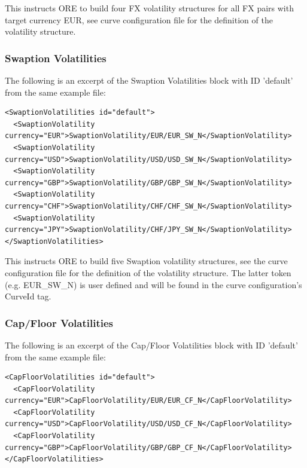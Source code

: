 This instructs ORE to build four FX volatility structures for all FX pairs with target currency EUR, see curve
configuration file for the definition of the volatility structure.

\subsubsection{Swaption Volatilities}

The following is an excerpt of the Swaption Volatilities block with ID 'default' from the same example file:

\begin{listing}[H]
\begin{verbatim}
<SwaptionVolatilities id="default">
  <SwaptionVolatility currency="EUR">SwaptionVolatility/EUR/EUR_SW_N</SwaptionVolatility>
  <SwaptionVolatility currency="USD">SwaptionVolatility/USD/USD_SW_N</SwaptionVolatility>
  <SwaptionVolatility currency="GBP">SwaptionVolatility/GBP/GBP_SW_N</SwaptionVolatility>
  <SwaptionVolatility currency="CHF">SwaptionVolatility/CHF/CHF_SW_N</SwaptionVolatility>
  <SwaptionVolatility currency="JPY">SwaptionVolatility/CHF/JPY_SW_N</SwaptionVolatility>
</SwaptionVolatilities>
\end{verbatim}
\caption{Swaption volatility block with ID 'default'}
\label{lst:swaptionvol_spec}
\end{listing}

This instructs ORE to build five Swaption volatility structures, see the curve configuration file for the definition of
the volatility structure. The latter token (e.g. EUR\_SW\_N) is user defined and will be found in the curve
configuration's CurveId tag.

\subsubsection{Cap/Floor Volatilities}

The following is an excerpt of the Cap/Floor Volatilities block with ID 'default' from the same example file:

\begin{listing}[H]
\begin{verbatim}
<CapFloorVolatilities id="default">
  <CapFloorVolatility currency="EUR">CapFloorVolatility/EUR/EUR_CF_N</CapFloorVolatility>
  <CapFloorVolatility currency="USD">CapFloorVolatility/USD/USD_CF_N</CapFloorVolatility>
  <CapFloorVolatility currency="GBP">CapFloorVolatility/GBP/GBP_CF_N</CapFloorVolatility>
</CapFloorVolatilities>
\end{verbatim}
\caption{Cap/Floor volatility block with ID 'default'}
\label{lst:capfloorvol_spec}
\end{listing}

